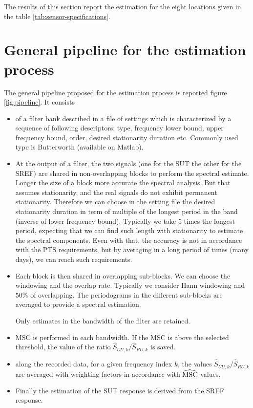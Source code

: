 The results of this section report the estimation for the eight locations given in the table \ref{tab:sensor-specifications}.

\section{General pipeline for the estimation process}
The general pipeline proposed for the estimation process is reported figure \ref{fig:pipeline}. It consists 
\begin{itemize}
\item
of a filter bank described in a file of settings which is characterized by a sequence of following descriptors: type, frequency lower bound, upper frequency bound, order, desired stationarity duration etc. Commonly used type is Butterworth (available on Matlab).
\item
At the output of a filter, the two signals (one for the SUT the other for the SREF) are shared in non-overlapping blocks to perform the spectral estimate. Longer the size of a block more accurate the spectral analysis. But that assumes stationarity, and the real signals do not exhibit permanent stationarity. Therefore we can choose in the setting file the desired stationarity duration in term of multiple of the longest period in the band (inverse of lower frequency bound). Typically we take  $5$ times the longest period, expecting that we can find such length with stationarity to estimate the spectral components. Even with that, the accuracy is not in accordance with the PTS requirements, but by averaging in a long period of times (many days), we can reach such requirements.


\item
Each block is then shared in overlapping sub-blocks. We can choose the windowing and the overlap rate. Typically we consider Hann windowing and $50\%$ of overlapping. The periodograms in the different sub-blocks are averaged to provide a spectral estimation. 

Only estimates in the bandwidth of the filter are retained.

\item
MSC is performed in each bandwidth. If the MSC is above the selected threshold, the value of the ratio $\hat S_{UU,k}/\hat S_{RU,k}$ is saved.



\item
along the recorded data, for a given frequency index $k$, the values  $\hat S_{UU,k}/\hat S_{RU,k}$ are averaged with weighting factors in accordance with $\widehat{\mathrm{MSC}}$ values.


\item
Finally the estimation of the SUT response is derived from the SREF response.


\end{itemize}

